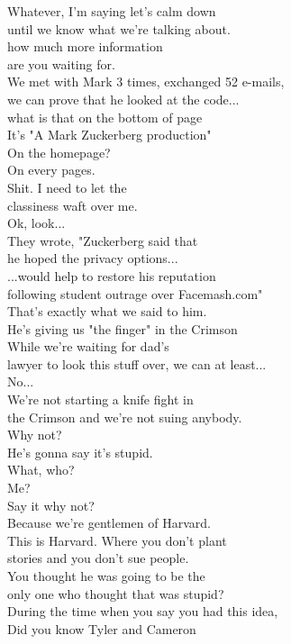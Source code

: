 \documentclass{article}
\begin{document}
\begin{multicols}{3}
Whatever, I'm saying let's calm down\\
until we know what we're talking about.\\
how much more information\\
are you waiting for.\\
We met with Mark 3 times, exchanged 52 e-mails,\\
we can prove that he looked at the code...\\
what is that on the bottom of page\\
It's "A Mark Zuckerberg production"\\
On the homepage?\\
On every pages.\\
Shit. I need to let the\\
classiness waft over me.\\
Ok, look...\\
They wrote, "Zuckerberg said that\\
he hoped the privacy options...\\
...would help to restore his reputation\\
following student outrage over Facemash.com"\\
That's exactly what we said to him.\\
He's giving us "the finger" in the Crimson\\
While we're waiting for dad's\\
lawyer to look this stuff over, we can at least...\\
No...\\
We're not starting a knife fight in\\
the Crimson and we're not suing anybody.\\
Why not?\\
He's gonna say it's stupid.\\
What, who?\\
Me?\\
Say it why not?\\
Because we're gentlemen of Harvard.\\
This is Harvard. Where you don't plant\\
stories and you don't sue people.\\
You thought he was going to be the\\
only one who thought that was stupid?\\
During the time when you say you had this idea,\\
Did you know Tyler and Cameron\\

\end{multicols}
\end{document}

